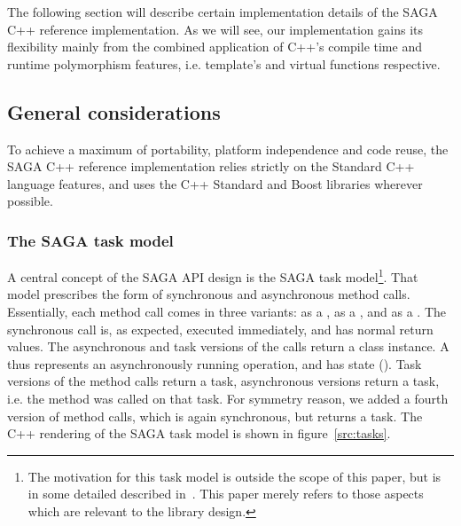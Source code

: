 
The following section will describe certain implementation details
of the SAGA C++ reference implementation. As we will see, our 
implementation gains its flexibility mainly from the combined
application of C++'s compile time and runtime polymorphism features,
i.e. template's and virtual functions respective.

\subsection{General considerations}

  To achieve a maximum of portability, platform independence and code
  reuse, the SAGA C++ reference implementation relies strictly on the
  Standard C++ language features, and uses the C++ Standard and Boost
  libraries wherever possible. 
  
\subsubsection{The SAGA task model}
\label{ssec:tasks}

  A central concept of the SAGA API design is the SAGA task
  model\footnote{\small The motivation for this task model is outside the
  scope of this paper, but is in some detailed described
  in~\cite{saga-paper}.  This paper merely refers to those aspects
  which are relevant to the library design.}.  That model prescribes
  the form of synchronous and asynchronous method calls.  Essentially,
  each method call comes in three variants: as a , 
  as a , and as a .  The synchronous call is, as
  expected, executed immediately, and has normal return values.  The
  asynchronous and task versions of the calls return a
   class instance.  A  thus represents an asynchronously
  running operation, and has state ().
  Task versions of the method calls return a  task,
  asynchronous versions return a  task, i.e. the 
  method was called on that task.  For symmetry reason, we added a
  fourth version of method calls, which is again synchronous, but
  returns a  task.
  The C++ rendering of the SAGA task model is shown in
  figure~\ref{src:tasks}.

